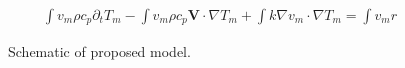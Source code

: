 \begin{align}
  \int v_m \rho c_p \partial_t T_m 
  - \int v_m \rho c_p \mathbf{V} \cdot \nabla T_m
  + \int k \nabla v_m \cdot \nabla T_m
  = \int v_m r
\end{align}

\par

\par
{}\par

\begin{figure}
  \caption{Schematic of proposed model.}
  \label{fig:schematic}
\end{figure}


\iffalse
Show reference model
Go over limitations
Introduce my model
\fi

